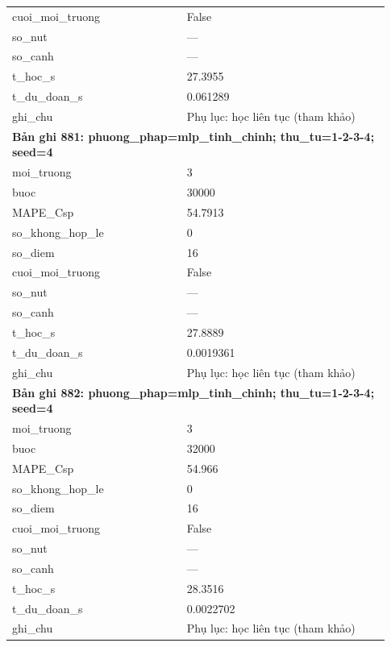 \begin{longtable}{p{0.43\linewidth}p{0.50\linewidth}}
cuoi\_\allowbreak moi\_\allowbreak truong & False \\
so\_\allowbreak nut & — \\
so\_\allowbreak canh & — \\
t\_\allowbreak hoc\_\allowbreak s & 27.3955 \\
t\_\allowbreak du\_\allowbreak doan\_\allowbreak s & 0.061289 \\
ghi\_\allowbreak chu & Phụ lục: học liên tục (tham khảo) \\
\midrule
\multicolumn{2}{p{0.95\linewidth}}{\textbf{Bản ghi 881: phuong\_phap=mlp\_tinh\_chinh; thu\_tu=1-2-3-4; seed=4}} \\
moi\_\allowbreak truong & 3 \\
buoc & 30000 \\
MAPE\_\allowbreak Csp & 54.7913 \\
so\_\allowbreak khong\_\allowbreak hop\_\allowbreak le & 0 \\
so\_\allowbreak diem & 16 \\
cuoi\_\allowbreak moi\_\allowbreak truong & False \\
so\_\allowbreak nut & — \\
so\_\allowbreak canh & — \\
t\_\allowbreak hoc\_\allowbreak s & 27.8889 \\
t\_\allowbreak du\_\allowbreak doan\_\allowbreak s & 0.0019361 \\
ghi\_\allowbreak chu & Phụ lục: học liên tục (tham khảo) \\
\midrule
\multicolumn{2}{p{0.95\linewidth}}{\textbf{Bản ghi 882: phuong\_phap=mlp\_tinh\_chinh; thu\_tu=1-2-3-4; seed=4}} \\
moi\_\allowbreak truong & 3 \\
buoc & 32000 \\
MAPE\_\allowbreak Csp & 54.966 \\
so\_\allowbreak khong\_\allowbreak hop\_\allowbreak le & 0 \\
so\_\allowbreak diem & 16 \\
cuoi\_\allowbreak moi\_\allowbreak truong & False \\
so\_\allowbreak nut & — \\
so\_\allowbreak canh & — \\
t\_\allowbreak hoc\_\allowbreak s & 28.3516 \\
t\_\allowbreak du\_\allowbreak doan\_\allowbreak s & 0.0022702 \\
ghi\_\allowbreak chu & Phụ lục: học liên tục (tham khảo) \\

\end{longtable}
